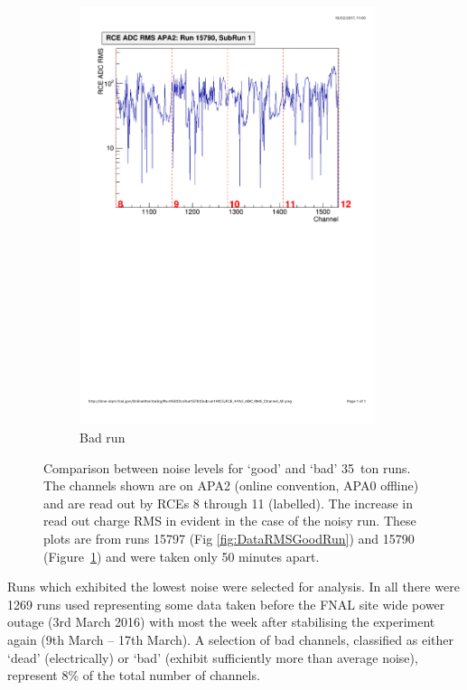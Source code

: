 \begin{figure}
\begin{subfigure}{0.45\linewidth}
    \includegraphics[width=0.95\textwidth]{DataRMSBad.pdf}
    \caption{Bad run}
    \label{fig:DataRMSBadRun}
  \end{subfigure}
  \caption[`Good' and `bad' 35~ton runs]{Comparison between noise levels for `good' and `bad' 35~ton runs.  The channels shown are on APA2 (online convention, APA0 offline) and are read out by RCEs 8 through 11 (labelled).  The increase in read out charge RMS in evident in the case of the noisy run.  These plots are from runs 15797 (Fig \ref{fig:DataRMSGoodRun}) and 15790 (Figure~\ref{fig:DataRMSBadRun}) and were taken only 50 minutes apart.}
  \label{fig:DataRMS}
\end{figure}

Runs which exhibited the lowest noise were selected for analysis.  In all there were 1269 runs used representing some data taken before the FNAL site wide power outage (3rd March 2016) with most the week after stabilising the experiment again (9th March -- 17th March).  A selection of bad channels, classified as either `dead' (electrically) or `bad' (exhibit sufficiently more than average noise), represent 8\% of the total number of channels.

